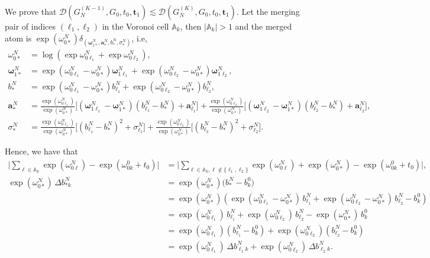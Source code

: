 \documentclass[twoside]{article}
\theoremstyle{plain}
\theoremstyle{definition}
\theoremstyle{plain}
\def\vomega{{\bm{\omega}}}
\def\va{{\bm{a}}}
\def\vt{{\bm{t}}}
\def\sA{{\mathbb{A}}}
\newcommand{\cD}{\mathcal{D}}
\begin{document}
     We prove that $\cD (G^{(K-1)}_N, G_0, t_0, \vt_1) \lesssim \cD (G^{(K)}_N, G_0, t_0, \vt_1)$. Let the merging pair of indices $(\ell_1, \ell_2)$ in the Voronoi cell $\sA_k$, then $|\sA_k| > 1$ and the merged atom is $\exp{(\omega_{0*}^N)} \delta_{(\vomega_{1*}^N, \va_*^N, b_*^N, \sigma_*^N)}$, i.e,
\begin{align}
    \omega_{0*}^N &= \log \left( \exp{\omega_{0\ell_1}^N} + \exp{\omega_{0\ell_2}^N} \right), \nonumber \\
    \vomega_{1*}^N &= \exp{\left(\omega_{0\ell_1}^N - \omega_{0*}^N \right)} \vomega_{1\ell_1}^N 
    + \exp{\left(\omega_{0\ell_2}^N - \omega_{0*}^N\right)} \vomega_{1\ell_2}^N, \nonumber\\
    b_*^N &= \exp{\left(\omega_{0\ell_1}^N - \omega_{0*}^N \right)} b_{\ell_1}^N 
    + \exp{\left(\omega_{0\ell_2}^N - \omega_{0*}^N\right)} b_{\ell_2}^N, \nonumber\\
    \va_*^N &= \frac{\exp(\omega_{0\ell_1}^N)}{\exp(\omega_{0*}^N)} \Big[(\vomega_{1\ell_1}^N - \vomega_{1*}^N)(b_{\ell_1}^N - b_*^N) + \va_{\ell_1}^N\Big] 
    + \frac{\exp(\omega_{0\ell_2}^N)}{\exp(\omega_{0*}^N)} \Big[(\vomega_{1\ell_2}^N - \vomega_{1*}^N)(b_{\ell_2}^N - b_*^N) + \va_{\ell_2}^N\Big], \nonumber \\
    \sigma_*^N &= \frac{\exp(\omega_{0\ell_1}^N)}{\exp(\omega_{0*}^N)} \Big[(b_{\ell_1}^N - b_*^N)^2 + \sigma_{\ell_1}^N\Big] 
    + \frac{\exp(\omega_{0\ell_2}^N)}{\exp(\omega_{0*}^N)} \Big[(b_{\ell_2}^N - b_*^N)^2 + \sigma_{\ell_2}^N\Big]. \nonumber
\end{align}

Hence, we have that 
\begin{align*}
    \Big|\sum_{\ell \in \sA_{k}} \exp(\omega_{0\ell}^N) - \exp(\omega_{0k}^{0} + t_{0})\Big| 
    &= \Big|\sum_{\ell \in \sA_{k}, \ell \not \in \{\ell_1, \ell_2\}} \exp(\omega_{0\ell}^N) + \exp{(\omega_{0*}^N)} - \exp(\omega_{0k}^{0} + t_{0})\Big|, \\
    \exp(\omega_{0*}^N)\, \Delta b_{*k}^N 
&= \exp(\omega_{0*}^N) \big( b_*^N - b_k^0 \big) \\
&= \exp(\omega_{0*}^N) \left( 
   \exp(\omega_{0\ell_1}^N - \omega_{0*}^N)\, b_{\ell_1}^N
 + \exp(\omega_{0\ell_2}^N - \omega_{0*}^N)\, b_{\ell_2}^N
 - b_k^0 \right) \\
&= \exp(\omega_{0\ell_1}^N)\, b_{\ell_1}^N 
 + \exp(\omega_{0\ell_2}^N)\, b_{\ell_2}^N 
 - \exp(\omega_{0*}^N)\, b_k^0 \\
 &= \exp(\omega_{0\ell_1}^N)(b_{\ell_1}^N - b_k^0)
 +  \exp(\omega_{0\ell_2}^N)(b_{\ell_2}^N - b_k^0) \\
 &=\exp(\omega_{0\ell_1}^N)\, \Delta b_{\ell_1 k}^N 
+ \exp(\omega_{0\ell_2}^N)\, \Delta b_{\ell_2 k}^N.
\end{align*}
\end{document}
